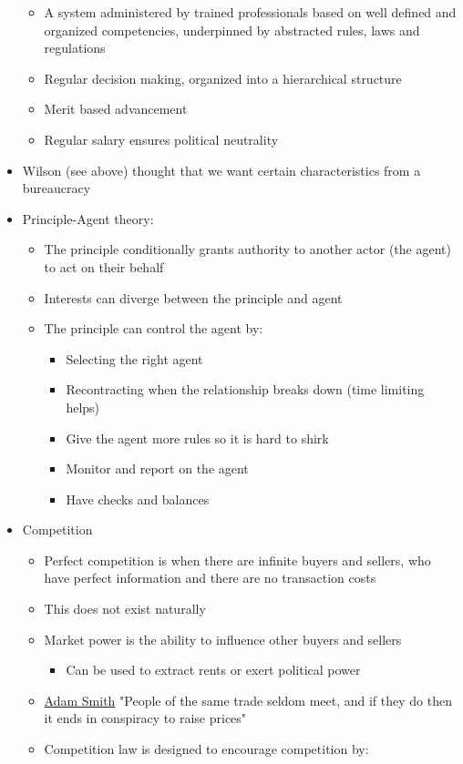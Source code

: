 \documentclass[11pt]{article}
\begin{document}
\begin{itemize}
\begin{itemize}
\item A system administered by trained professionals based on well defined and
organized competencies, underpinned by abstracted rules, laws and regulations
\item Regular decision making, organized into a hierarchical structure
\item Merit based advancement
\item Regular salary ensures political neutrality
\end{itemize}
\item Wilson (see above) thought that we want certain characteristics from a bureaucracy
\item Principle-Agent theory:
\begin{itemize}
\item The principle conditionally grants authority to another actor (the agent) to
act on their behalf
\item Interests can diverge between the principle and agent
\item The principle can control the agent by:
\begin{itemize}
\item Selecting the right agent
\item Recontracting when the relationship breaks down (time limiting helps)
\item Give the agent more rules so it is hard to shirk
\item Monitor and report on the agent
\item Have checks and balances
\end{itemize}
\end{itemize}
\item Competition
\begin{itemize}
\item Perfect competition is when there are infinite buyers and sellers, who have
perfect information and there are no transaction costs
\item This does not exist naturally
\item Market power is the ability to influence other buyers and sellers
\begin{itemize}
\item Can be used to extract rents or exert political power
\end{itemize}
\item \href{Adam Smith.org}{Adam Smith} "People of the same trade seldom meet, and if they do then it
ends in conspiracy to raise prices"
\item Competition law is designed to encourage competition by:

\end{itemize}
\end{itemize}
\end{document}
